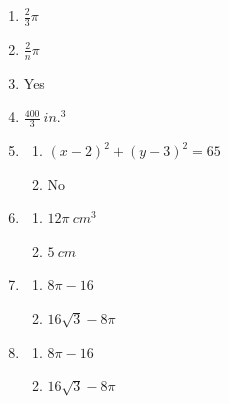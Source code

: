 \documentclass{article}
\begin{document}
\begin{enumerate}
\begin{enumerate}
	\item Center: $(-1, 4)$ \\
		Radius: $3$
	
	\end{enumerate}
	
\item $\frac{2}{3} \pi$

\item $\frac{2}{n} \pi$

\item Yes

\item  $\frac{400}{3} \ in.^3$

\item

	\begin{enumerate}
	
	\item $(x - 2)^2 + (y - 3)^2 = 65$
	
	\item No
	
	\end{enumerate}
	
\item

	\begin{enumerate}
	
	\item $12 \pi \ cm^3$
	
	\item $5 \ cm$
	
	\end{enumerate}
	
\item

	\begin{enumerate}
	
	\item $8 \pi - 16$
	
	\item $16\sqrt{3} - 8\pi$
	
	\end{enumerate}

\item

	\begin{enumerate}
	
	\item $8\pi - 16$
	
	\item $16\sqrt{3} - 8\pi$
	
	\end{enumerate}
	

\end{enumerate}
\end{document}
